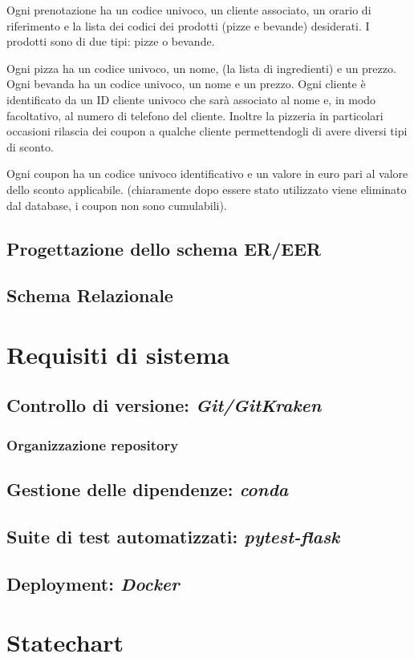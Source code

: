 \documentclass[a4paper, 12 pt]{article}
\begin{document}
		Ogni prenotazione ha un codice univoco, un cliente associato, un orario di riferimento e la lista dei
		codici dei prodotti (pizze e bevande) desiderati.
		I prodotti sono di due tipi: pizze o bevande.
		
		Ogni pizza ha un codice univoco, un nome, (la lista di ingredienti) e un prezzo.
		Ogni bevanda ha un codice univoco, un nome e un prezzo.
		Ogni cliente è identificato da un ID cliente univoco che sarà associato al nome e, in modo facoltativo, al numero di telefono del cliente.
		Inoltre la pizzeria in particolari occasioni rilascia dei coupon a qualche cliente permettendogli
		di avere diversi tipi di sconto.
		
		Ogni coupon ha un codice univoco identificativo e un valore in euro pari al valore dello sconto applicabile.
		(chiaramente dopo essere stato utilizzato viene eliminato dal database, i coupon non sono cumulabili).
		
		\subsection*{Progettazione dello schema ER/EER}
		\subsection*{Schema Relazionale}
	\break
	
	\section* {Requisiti di sistema}
		\subsection*{Controllo di versione: \textit{Git/GitKraken}}
			\subsubsection*{Organizzazione repository}
		\subsection*{Gestione delle dipendenze: \textit{conda}}
		\subsection*{Suite di test automatizzati: \textit{pytest-flask}}
		\subsection*{Deployment: \textit{Docker}}
	\break
	
	\section*{Statechart}
	\break
	
	
	
\end{document}
